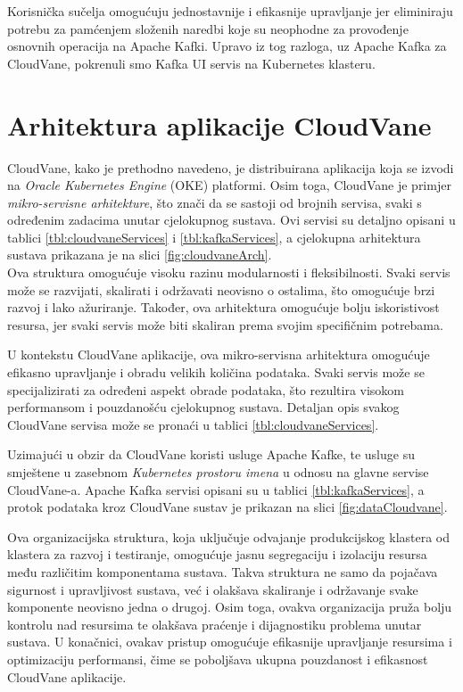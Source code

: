 \documentclass[times, utf8, diplomski]{fer}
\begin{document}
Korisnička sučelja omogućuju jednostavnije i efikasnije upravljanje jer eliminiraju potrebu za pamćenjem složenih naredbi koje su neophodne za provođenje osnovnih operacija na Apache Kafki. Upravo iz tog razloga, uz Apache Kafka za CloudVane, pokrenuli smo Kafka UI servis na Kubernetes klasteru.

\section{Arhitektura aplikacije CloudVane}
\label{sec:architecture}

CloudVane, kako je prethodno navedeno, je distribuirana aplikacija koja se izvodi na \emph{Oracle Kubernetes Engine} (OKE) platformi. Osim toga, CloudVane je primjer \emph{mikro-servisne arhitekture}, što znači da se sastoji od brojnih servisa, svaki s određenim zadacima unutar cjelokupnog sustava. Ovi servisi su detaljno opisani u tablici \ref{tbl:cloudvaneServices} i \ref{tbl:kafkaServices}, a cjelokupna arhitektura sustava prikazana je na slici \ref{fig:cloudvaneArch}.\\

Ova struktura omogućuje visoku razinu modularnosti i fleksibilnosti. Svaki servis može se razvijati, skalirati i održavati neovisno o ostalima, što omogućuje brzi razvoj i lako ažuriranje. Također, ova arhitektura omogućuje bolju iskoristivost resursa, jer svaki servis može biti skaliran prema svojim specifičnim potrebama.

U kontekstu CloudVane aplikacije, ova mikro-servisna arhitektura omogućuje efikasno upravljanje i obradu velikih količina podataka. Svaki servis može se specijalizirati za određeni aspekt obrade podataka, što rezultira visokom performansom i pouzdanošću cjelokupnog sustava. Detaljan opis svakog CloudVane servisa može se pronaći u tablici \ref{tbl:cloudvaneServices}.

Uzimajući u obzir da CloudVane koristi usluge Apache Kafke, te usluge su smještene u zasebnom \emph{Kubernetes prostoru imena}  u odnosu na glavne servise CloudVane-a. Apache Kafka servisi opisani su u tablici \ref{tbl:kafkaServices}, a protok podataka kroz CloudVane sustav je prikazan na slici \ref{fig:dataCloudvane}.

Ova organizacijska struktura, koja uključuje odvajanje produkcijskog klastera od klastera za razvoj i testiranje, omogućuje jasnu segregaciju i izolaciju resursa među različitim komponentama sustava. Takva struktura ne samo da pojačava sigurnost i upravljivost sustava, već i olakšava skaliranje i održavanje svake komponente neovisno jedna o drugoj. Osim toga, ovakva organizacija pruža bolju kontrolu nad resursima te olakšava praćenje i dijagnostiku problema unutar sustava. U konačnici, ovakav pristup omogućuje efikasnije upravljanje resursima i optimizaciju performansi, čime se poboljšava ukupna pouzdanost i efikasnost CloudVane aplikacije.
\end{document}

